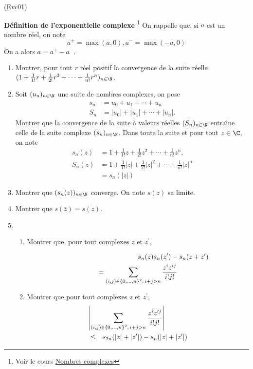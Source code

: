 \begin{tiny}(Evc01)\end{tiny}
\textbf{Définition de l'exponentielle complexe}
\footnote{Voir le cours  \href{http://back.maquisdoc.net/data/cours_nicolair/C2002.pdf}{Nombres complexes}}
\newline
On rappelle que, si $a$ est un nombre r{\'e}el, on note $$a^{+}=\max (a,0), a^{-}=\max (-a,0)$$ On a alors $a=a^{+}-a^{-}$.

\begin{enumerate}
  \item Montrer, pour tout $r$ r{\'e}el positif la convergence de la suite r{\'e}elle $(1+\frac{1}{1!}r+\frac{1}{2!}r^{2}+\cdots +\frac{1}{n!} r^{n})_{n\in \N}$.

  \item Soit $(u_{n})_{n\in \N}$ une suite de nombres complexes, on pose
\begin{align*}
s_{n} &= u_{0}+u_{1}+\cdots +u_{n}\\
S_{n} &= | u_{0}|+| u_{1}| +\cdots + |u_{n}|.
\end{align*}
Montrer que la convergence de la suite à valeurs r{\'e}elles $(S_{n})_{n\in \N}$ entra{\^\i}ne celle de la suite complexe $(s_{n})_{n\in \N}$. Dans toute la suite et pour tout $z \in \C$, on note
\begin{align*}
s_n(z) &= 1+\frac 1{1!}z+\frac 1{2!}z^2+\cdots +\frac 1{n!}z^n, \\
S_n(z) &= 1+\frac 1{1!}| z| +\frac 1{2!}| z| ^2+\cdots+\frac 1{n!}| z| ^n\\
&= s_n(| z| )
\end{align*}

  \item Montrer que $(s_{n}(z))_{n\in \N}$ converge. On note $s(z)$ sa limite.

  \item Montrer que $s(\overline{z})=\overline{s(z)}$.
  \item 
  \begin{enumerate}
    \item Montrer que, pour tout complexes $z$ et $z^{\prime }$,

  \begin{multline*}
\lefteqn{s_{n}(z)s_{n}(z^{\prime })-s_{n}(z+z^{\prime })}\\
= \sum_{(i,j)\in \{0,\ldots ,n \}^{2},\, i+j>n } \frac{z^{i}z^{\prime j}}{i!j!}
\end{multline*}
    \item Montrer que pour tout complexes $z$ et $z^{\prime }$,
\begin{eqnarray*}
\lefteqn{\left| \sum_{(i,j)\in \left\{ 0,\ldots ,n\right\} ^{2},\, i+j>n} \frac{z^{i}z^{\prime j}}{i!j!}\right|}\\
&\leq& s_{2n}(| z| +|z^{\prime }| )-s_{n}(| z| +| z^{\prime }| )
\end{eqnarray*}


\end{enumerate}
\end{enumerate}
